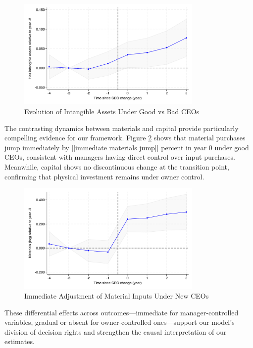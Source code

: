 \documentclass[11pt,a4paper]{article}
\begin{document}
\begin{figure}[htbp]
\centering
\includegraphics[width=0.8\textwidth]{figure/event_study_has_intangible.pdf}
\caption{Evolution of Intangible Assets Under Good vs Bad CEOs}
\label{fig:intangibles}
\end{figure}

The contrasting dynamics between materials and capital provide particularly compelling evidence for our framework. Figure \ref{fig:materials} shows that material purchases jump immediately by [[immediate materials jump]] percent in year 0 under good CEOs, consistent with managers having direct control over input purchases. Meanwhile, capital shows no discontinuous change at the transition point, confirming that physical investment remains under owner control.

\begin{figure}[htbp]
\centering
\includegraphics[width=0.8\textwidth]{figure/event_study_lnM.pdf}
\caption{Immediate Adjustment of Material Inputs Under New CEOs}
\label{fig:materials}
\end{figure}

These differential effects across outcomes—immediate for manager-controlled variables, gradual or absent for owner-controlled ones—support our model's division of decision rights and strengthen the causal interpretation of our estimates.
\end{document}
